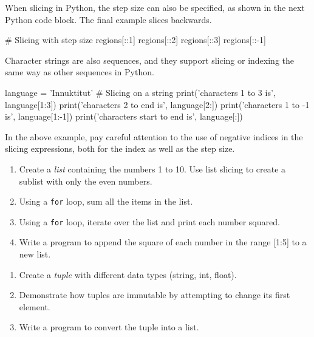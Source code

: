 When slicing in Python, the step size can also be specified, as shown in the next Python code block. The final example slices backwards.

\begin{pythoncode}
# Slicing with step size
regions[::1]
regions[::2]
regions[::3]
regions[::-1]
\end{pythoncode}

Character strings are also sequences, and they support slicing or indexing the same way as other sequences in Python.

\begin{pythoncode}
language = 'Innuktitut'
# Slicing on a string 
print('characters 1 to 3 is', language[1:3])
print('characters 2 to end is', language[2:])
print('characters 1 to -1 is', language[1:-1])
print('characters start to end is', language[:])
\end{pythoncode}

\noindent In the above example, pay careful attention to the use of negative indices in the slicing expressions, both for the index as well as the step size.


\begin{exercisebox}
\begin{enumerate}
    \item Create a \emph{list} containing the numbers 1 to 10. Use list slicing to create a sublist with only the even numbers.
    \item Using a \texttt{for} loop, sum all the items in the list.
    \item Using a \texttt{for} loop, iterate over the list and print each number squared.
    \item Write a program to append the square of each number in the range [1:5] to a new list.
\end{enumerate}
\end{exercisebox}

\begin{exercisebox}
\begin{enumerate}
    \item Create a \emph{tuple} with different data types (string, int, float).
    \item Demonstrate how tuples are immutable by attempting to change its first element.
    \item Write a program to convert the tuple into a list.
\end{enumerate}
\end{exercisebox}

